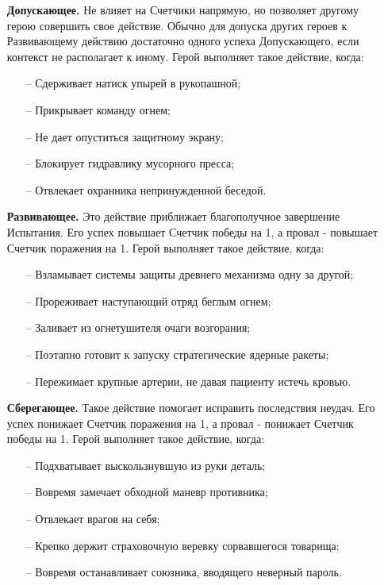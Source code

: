 \begin{itemize}
    \item[]\textbf{Допускающее.} Не влияет на Счетчики напрямую, но позволяет другому герою совершить свое действие. Обычно для допуска других героев к Развивающему действию достаточно одного успеха Допускающего, если контекст не располагает к иному. Герой выполняет такое действие, когда:
    \begin{itemize}
        \item[--] Сдерживает натиск упырей в рукопашной;
        \item[--] Прикрывает команду огнем;
        \item[--] Не дает опуститься защитному экрану;
        \item[--] Блокирует гидравлику мусорного пресса;
        \item[--] Отвлекает охранника непринужденной беседой.
    \end{itemize}
\item[]\textbf{Развивающее.} Это действие приближает благополучное завершение Испытания. Его успех повышает Счетчик победы на 1, а провал - повышает Счетчик поражения на 1. Герой выполняет такое действие, когда:
\begin{itemize}
    \item[--] Взламывает системы защиты древнего механизма одну за другой;
    \item[--] Прореживает наступающий отряд беглым огнем;
    \item[--] Заливает из огнетушителя очаги возгорания;
    \item[--] Поэтапно готовит к запуску стратегические ядерные ракеты;
    \item[--] Пережимает крупные артерии, не давая пациенту истечь кровью.
    \end{itemize}
\item[]\textbf{Сберегающее.} Такое действие помогает исправить последствия неудач. Его успех понижает Счетчик поражения на 1, а провал - понижает Счетчик победы на 1. Герой выполняет такое действие, когда:
\begin{itemize}
    \item[--] Подхватывает выскользнувшую из руки деталь;
    \item[--] Вовремя замечает обходной маневр противника;
    \item[--] Отвлекает врагов на себя;
    \item[--] Крепко держит страховочную веревку сорвавшегося товарища;
    \item[--] Вовремя останавливает союзника, вводящего неверный пароль.
\end{itemize}


\end{itemize}

